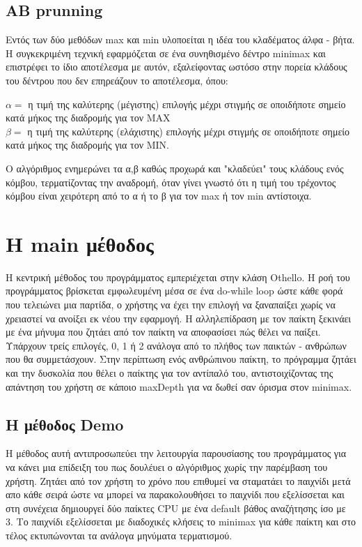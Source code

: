\documentclass[12pt]{article}
\begin{document}
\subsection*{ΑΒ prunning}
Εντός των δύο μεθόδων max και min υλοποείται η ιδέα του κλαδέματος άλφα - βήτα. Η συγκεκριμένη τεχνική εφαρμόζεται σε ένα συνηθισμένο δέντρο minimax και επιστρέφει το ίδιο αποτέλεσμα με αυτόν, εξαλείφοντας ωστόσο στην πορεία κλάδους του δέντρου που δεν επηρεάζουν το αποτέλεσμα, όπου: 
\begin{center}
$ α = $ η τιμή της καλύτερης (μέγιστης) επιλογής μέχρι στιγμής σε οποιδήποτε σημείο κατά μήκος της διαδρομής για τον MAX \\ $β = $ η τιμή της καλύτερης (ελάχιστης) επιλογής μέχρι στιγμής σε οποιδήποτε σημείο κατά μήκος της διαδρομής για τον MIN. 
\end{center}
Ο αλγόριθμος ενημερώνει τα α,β καθώς προχωρά και "κλαδεύει" τους κλάδους ενός κόμβου, τερματίζοντας την αναδρομή, όταν γίνει γνωστό ότι η τιμή του τρέχοντος κόμβου είναι χειρότερη από το α ή το β για τον max ή τον min αντίστοιχα. 

\section{Η main μέθοδος}
Η κεντρική μέθοδος του προγράμματος εμπεριέχεται στην κλάση Othello. Η ροή του προγράμματος βρίσκεται εμφωλευμένη μέσα σε ένα do-while loop ώστε κάθε φορά που τελειώνει μια παρτίδα, ο χρήστης να έχει την επιλογή να ξαναπαίξει χωρίς να χρειαστεί να ανοίξει εκ νέου την εφαρμογή. Η αλληλεπίδραση με τον παίκτη ξεκινάει με ένα μήνυμα που ζητάει από τον παίκτη να αποφασίσει πώς θέλει να παίξει. Υπάρχουν τρείς επιλογές, 0, 1 ή 2 ανάλογα από το πλήθος των παικτών - ανθρώπων που θα συμμετάσχουν.  Στην περίπτωση ενός ανθρώπινου παίκτη, το πρόγραμμα ζητάει και την δυσκολία που θέλει ο παίκτης για τον αντίπαλό του, αντιστοιχίζοντας της απάντηση του χρήστη σε κάποιο maxDepth για να δωθεί σαν όρισμα στον minimax. 
    \subsection{Η μέθοδος Demo}
    Η μέθοδος αυτή αντιπροσωπεύει την λειτουργία παρουσίασης του προγράμματος για να κάνει μια επίδειξη του πως δουλέυει ο αλγόριθμος χωρίς την παρέμβαση του χρήστη. Zητάει από τον χρήστη το χρόνο που επιθυμεί να σταματάει το παιχνίδι μετά απο κάθε σειρά ώστε να μπορεί να παρακολουθήσει το παιχνίδι που εξελίσσεται και στη συνέχεια δημιουργεί δύο παίκτες CPU με ένα default βάθος αναζήτησης ίσο με 3. Το παιχνίδι εξελίσσεται με διαδοχικές κλήσεις το minimax για κάθε παίκτη και στο τέλος εκτυπώνονται τα ανάλογα μηνύματα τερματισμού.
\end{document}
